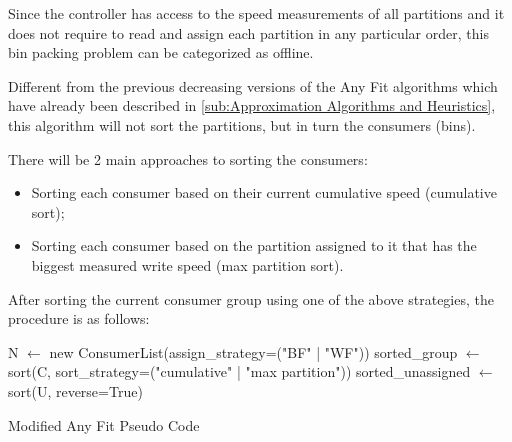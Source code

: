 Since the controller has access to the speed measurements of all partitions and
    it does not require to read and assign each partition in any particular
    order, this bin packing problem can be categorized as offline.

Different from the previous decreasing versions of the Any Fit algorithms which
    have already been described in \ref{sub:Approximation Algorithms and
    Heuristics}, this algorithm will not sort the partitions, but in turn the
    consumers (bins).

There will be 2 main approaches to sorting the consumers: \begin{itemize} \item
        Sorting each consumer based on their current cumulative speed
    (cumulative sort); \item Sorting each consumer based on the partition
        assigned to it that has the biggest measured write speed (max partition
        sort).  \end{itemize}

After sorting the current consumer group using one of the above strategies, the
    procedure is as follows:

\IncMargin{1em} \begin{algorithm}[h]
       \BlankLine N $\leftarrow$ new
    ConsumerList(assign\_strategy=("BF" | "WF"))\; sorted\_group $\leftarrow$
    sort(C, sort\_strategy=("cumulative" | "max partition"))\; 
    sorted\_unassigned $\leftarrow$ sort(U, reverse=True)\;   \caption{Modified
Any Fit Pseudo Code}\label{algo:MBPP} \end{algorithm}\DecMargin{1em}


